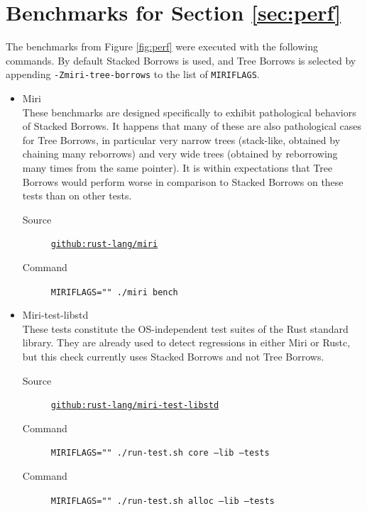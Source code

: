 \documentclass[a4paper,11pt]{article}
\theoremstyle{plain}
\theoremstyle{definition}
\theoremstyle{remark}
\begin{document}

\newpage




\appendix

\newpage
\section{Benchmarks for Section \ref{sec:perf}}
\label{app:perf}

The benchmarks from Figure \ref{fig:perf} were executed with the following commands.
By default Stacked Borrows is used, and Tree Borrows is selected by appending
\texttt{-Zmiri-tree-borrows} to the list of \texttt{MIRIFLAGS}.

\begin{itemize}
    \item Miri\\
        These benchmarks are designed specifically to exhibit pathological behaviors of
        Stacked Borrows. It happens that many of these are also pathological cases for Tree Borrows,
        in particular very narrow trees (stack-like, obtained by chaining many reborrows)
        and very wide trees (obtained by reborrowing many times from the same pointer).
        It is within expectations that Tree Borrows would perform worse in comparison
        to Stacked Borrows on these tests than on other tests.
        \begin{description}
            \item[Source] \href{https://github.com/rust-lang/miri}{\texttt{github:rust-lang/miri}}
            \item[Command] \texttt{MIRIFLAGS="" ./miri bench}
        \end{description}
    \item Miri-test-libstd\\
        These tests constitute the OS-independent test suites of the Rust standard library. They
        are already used to detect regressions in either Miri or Rustc, but this check currently
        uses Stacked Borrows and not Tree Borrows.
        \begin{description}
            \item[Source] \href{https://github.com/rust-lang/miri-test-libstd}{\texttt{github:rust-lang/miri-test-libstd}}
            \item[Command] \texttt{MIRIFLAGS="" ./run-test.sh core --lib --tests}
            \item[Command] \texttt{MIRIFLAGS="" ./run-test.sh alloc --lib --tests}

\end{description}
\end{itemize}
\end{document}
